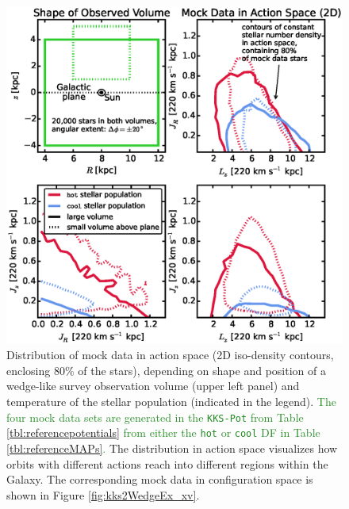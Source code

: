 \documentclass[iop,revtex4]{emulateapj}
\newcommand{\pmodel}{\ensuremath{p_M}}
\newcommand{\NEW}[1]{\textcolor{ForestGreen}{#1}}
\newcommand{\OLD}[1]{}
\begin{document}
\begin{appendix}
\begin{figure}[!htbp]
\centering
\begin{minipage}{0.48\textwidth}
\centering
\includegraphics[width=\textwidth]{figs/kks2WedgeEx_mockdata_actions.eps}
\caption{Distribution of mock data in action space (2D iso-density contours, enclosing 80\% of the stars), depending on shape and position of a wedge-like survey observation volume (upper left panel) and temperature of the stellar population (indicated in the legend). \OLD{The \pmodel{} of the mock data, created in the \texttt{KKS-Pot} potential, are given as Test 1 in Table 3.}\NEW{The four mock data sets are generated in the \texttt{KKS-Pot} from Table \ref{tbl:referencepotentials} from either the \texttt{hot} or \texttt{cool} DF in Table \ref{tbl:referenceMAPs}.} The distribution in action space visualizes how orbits with different actions reach into different regions within the Galaxy. The corresponding mock data in configuration space is shown in Figure \ref{fig:kks2WedgeEx_xv}.} 
\label{fig:kks2WedgeEx_actions}
\end{minipage}
\hfill
\begin{minipage}{0.48\textwidth}
\centering

\end{minipage}
\end{figure}
\end{appendix}
\end{document}
